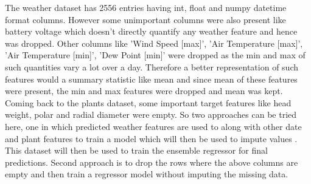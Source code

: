 \documentclass{article}
\begin{document}
The weather dataset has 2556 entries having int, float and numpy datetime format columns. However some unimportant columns were also present like battery voltage which doesn't  directly quantify any weather feature and hence was dropped. Other columns like 'Wind Speed [max]', 'Air Temperature [max]', 'Air Temperature [min]', 'Dew Point [min]' were dropped as the min and max of such quantities vary a lot over a day. Therefore a better representation of such features would a summary statistic like mean and since mean of these features were present, the min and max features were dropped and mean was kept.\\
Coming back to the plants dataset, some important target features like head weight, polar and radial diameter were empty.
So two approaches can be tried here, one in which predicted weather features are used to along with other date and plant features to train a model which will then be used to impute values \cite{kuhn2019feature}. This dataset will then be used to train the ensemble regressor for final predictions. Second approach is to drop the rows where the above columns are empty and then train a regressor model without imputing the missing data.                                                                                                                                                                                                                                                                                                             
\end{document}

